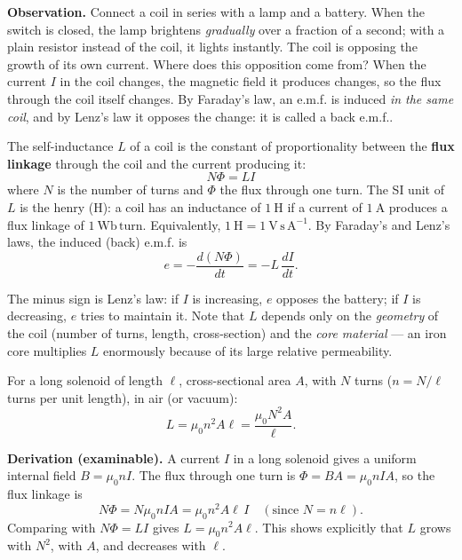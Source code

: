 \documentclass[11pt]{article}
\newcommand{\cle}[1]{{\popxbold\color{popdark}#1}}
\newcounter{popsec}
\newcounter{popsub}
\newcommand{\courssub}[1]{%
  \stepcounter{popsub}%
  \par\vspace{9pt}\noindent{\popxbold\fontsize{11.5}{13}\selectfont\color{popink}{\color{poporange}\thepopsec.\thepopsub}\hspace{6pt}#1}\par\nopagebreak\vspace{4pt}
}
\begin{document}
\courssub{Self-Inductance}

\textbf{Observation.} Connect a coil in series with a lamp and a battery. When the switch is closed, the lamp brightens \emph{gradually} over a fraction of a second; with a plain resistor instead of the coil, it lights instantly. The coil is opposing the growth of its own current. Where does this opposition come from? When the current $I$ in the coil changes, the magnetic field it produces changes, so the flux through the coil itself changes. By Faraday's law, an e.m.f. is induced \emph{in the same coil}, and by Lenz's law it opposes the change: it is called a \cle{back e.m.f.}.

\begin{definition}
The \cle{self-inductance} $L$ of a coil is the constant of proportionality between the \textbf{flux linkage} through the coil and the current producing it:
\[
N\Phi = LI
\]
where $N$ is the number of turns and $\Phi$ the flux through one turn. The SI unit of $L$ is the \cle{henry} (H): a coil has an inductance of $1\ \mathrm{H}$ if a current of $1\ \mathrm{A}$ produces a flux linkage of $1\ \mathrm{Wb\,turn}$. Equivalently, $1\ \mathrm{H} = 1\ \mathrm{V\,s\,A^{-1}}$. By Faraday's and Lenz's laws, the induced (back) e.m.f. is
\[
e = -\frac{d(N\Phi)}{dt} = -L\,\frac{dI}{dt}.
\]
\end{definition}

The minus sign is Lenz's law: if $I$ is increasing, $e$ opposes the battery; if $I$ is decreasing, $e$ tries to maintain it. Note that $L$ depends only on the \emph{geometry} of the coil (number of turns, length, cross-section) and the \emph{core material} — an iron core multiplies $L$ enormously because of its large relative permeability.

\begin{propriete}
For a long solenoid of length $\ell$, cross-sectional area $A$, with $N$ turns ($n = N/\ell$ turns per unit length), in air (or vacuum):
\[
L = \mu_0 n^2 A \ell = \frac{\mu_0 N^2 A}{\ell}.
\]
\end{propriete}

\textbf{Derivation (examinable).} A current $I$ in a long solenoid gives a uniform internal field $B = \mu_0 n I$. The flux through one turn is $\Phi = BA = \mu_0 n I A$, so the flux linkage is
\[
N\Phi = N\mu_0 n I A = \mu_0 n^2 A \ell\, I \quad (\text{since } N = n\ell).
\]
Comparing with $N\Phi = LI$ gives $L = \mu_0 n^2 A\ell$. This shows explicitly that $L$ grows with $N^2$, with $A$, and decreases with $\ell$.
\end{document}
